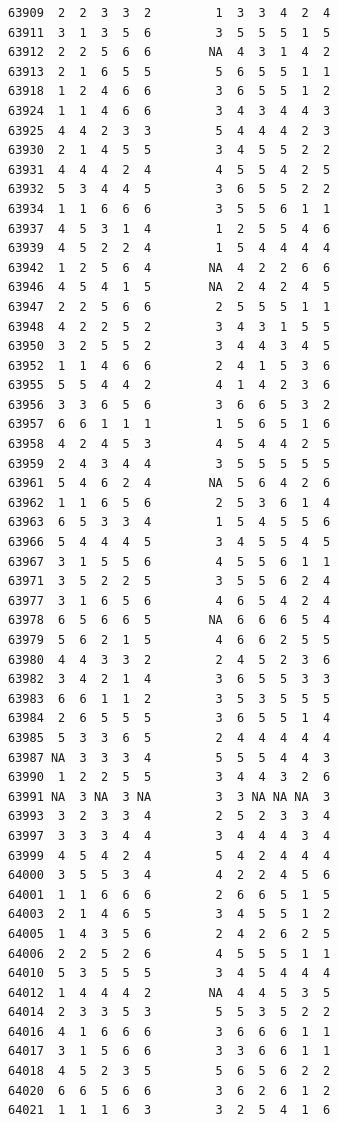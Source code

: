 \documentclass[
  letterpaper,
  DIV=11,
  numbers=noendperiod]{scrreprt}
\begin{document}
\begin{verbatim}
63909  2  2  3  3  2         1  3  3  4  2  4
63911  3  1  3  5  6         3  5  5  5  1  5
63912  2  2  5  6  6        NA  4  3  1  4  2
63913  2  1  6  5  5         5  6  5  5  1  1
63918  1  2  4  6  6         3  6  5  5  1  2
63924  1  1  4  6  6         3  4  3  4  4  3
63925  4  4  2  3  3         5  4  4  4  2  3
63930  2  1  4  5  5         3  4  5  5  2  2
63931  4  4  4  2  4         4  5  5  4  2  5
63932  5  3  4  4  5         3  6  5  5  2  2
63934  1  1  6  6  6         3  5  5  6  1  1
63937  4  5  3  1  4         1  2  5  5  4  6
63939  4  5  2  2  4         1  5  4  4  4  4
63942  1  2  5  6  4        NA  4  2  2  6  6
63946  4  5  4  1  5        NA  2  4  2  4  5
63947  2  2  5  6  6         2  5  5  5  1  1
63948  4  2  2  5  2         3  4  3  1  5  5
63950  3  2  5  5  2         3  4  4  3  4  5
63952  1  1  4  6  6         2  4  1  5  3  6
63955  5  5  4  4  2         4  1  4  2  3  6
63956  3  3  6  5  6         3  6  6  5  3  2
63957  6  6  1  1  1         1  5  6  5  1  6
63958  4  2  4  5  3         4  5  4  4  2  5
63959  2  4  3  4  4         3  5  5  5  5  5
63961  5  4  6  2  4        NA  5  6  4  2  6
63962  1  1  6  5  6         2  5  3  6  1  4
63963  6  5  3  3  4         1  5  4  5  5  6
63966  5  4  4  4  5         3  4  5  5  4  5
63967  3  1  5  5  6         4  5  5  6  1  1
63971  3  5  2  2  5         3  5  5  6  2  4
63977  3  1  6  5  6         4  6  5  4  2  4
63978  6  5  6  6  5        NA  6  6  6  5  4
63979  5  6  2  1  5         4  6  6  2  5  5
63980  4  4  3  3  2         2  4  5  2  3  6
63982  3  4  2  1  4         3  6  5  5  3  3
63983  6  6  1  1  2         3  5  3  5  5  5
63984  2  6  5  5  5         3  6  5  5  1  4
63985  5  3  3  6  5         2  4  4  4  4  4
63987 NA  3  3  3  4         5  5  5  4  4  3
63990  1  2  2  5  5         3  4  4  3  2  6
63991 NA  3 NA  3 NA         3  3 NA NA NA  3
63993  3  2  3  3  4         2  5  2  3  3  4
63997  3  3  3  4  4         3  4  4  4  3  4
63999  4  5  4  2  4         5  4  2  4  4  4
64000  3  5  5  3  4         4  2  2  4  5  6
64001  1  1  6  6  6         2  6  6  5  1  5
64003  2  1  4  6  5         3  4  5  5  1  2
64005  1  4  3  5  6         2  4  2  6  2  5
64006  2  2  5  2  6         4  5  5  5  1  1
64010  5  3  5  5  5         3  4  5  4  4  4
64012  1  4  4  4  2        NA  4  4  5  3  5
64014  2  3  3  5  3         5  5  3  5  2  2
64016  4  1  6  6  6         3  6  6  6  1  1
64017  3  1  5  6  6         3  3  6  6  1  1
64018  4  5  2  3  5         5  6  5  6  2  2
64020  6  6  5  6  6         3  6  2  6  1  2
64021  1  1  1  6  3         3  2  5  4  1  6

\end{verbatim}
\end{document}
